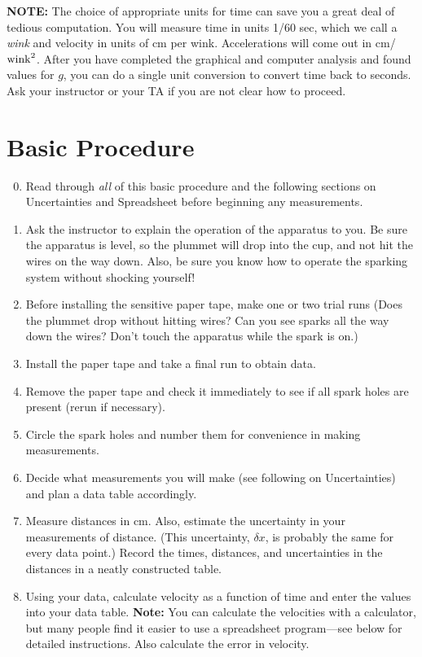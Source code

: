 {\bf NOTE:} The choice of appropriate units for time can save you
a great deal of tedious computation. You will measure time
in units 1/60 sec, which we call a {\em wink} and velocity
 in units of cm per wink. Accelerations will come out in
cm/${\rm wink}^2$. After
you have completed the graphical and computer analysis and found
values for $g$, you can do a single unit conversion to
convert time back to seconds.  Ask your instructor or your TA if you
are not clear how to proceed.

\section*{Basic Procedure}
\begin{enumerate}\setcounter{enumi}{-1}
\item Read through {\em all} of this basic procedure and the following sections
on Uncertainties and Spreadsheet before beginning any measurements.

\item Ask the instructor to explain the operation of the apparatus to you.  Be
sure the apparatus is level, so the plummet will drop into the cup, and not hit
the wires on the way down.  Also, be sure you know how to operate the sparking
system without shocking yourself!


\item Before installing the sensitive paper tape, make one or two trial runs
(Does the plummet drop without hitting wires?  Can you see sparks all the
way down the wires?  Don't touch the apparatus while the spark is on.)

\item Install the paper tape and take a final run to obtain data.

\item Remove the paper tape and check it immediately to see if all spark holes
are present (rerun if necessary).

\item Circle the spark holes and number them for convenience in making
measurements.

\item Decide what measurements you will make (see following on Uncertainties) and plan a data table 
accordingly.

\item Measure distances in cm.
Also, estimate the uncertainty in your
measurements of distance. (This uncertainty, $\delta x$, is probably the
same for every data point.)  Record the times, distances, and
uncertainties in the distances in a neatly constructed table.
%
\item Using your data, calculate velocity as a function
of time and enter the values
into your data table.  {\bf Note:}  You can calculate
the velocities with a calculator, but many people find it easier to use a
spreadsheet program---see below for detailed instructions.  
Also calculate the error in velocity.


\end{enumerate}
